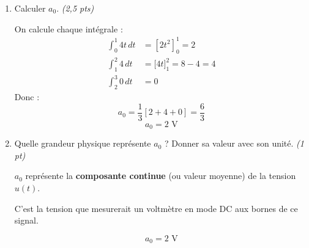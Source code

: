 \documentclass[a4paper,11pt]{article}
\begin{document}
\begin{enumerate}[label=\textbf{\arabic*.}]
  \item Calculer $a_0$. \hfill \textit{(2,5 pts)}
  \begin{tcolorbox}[corrigebox]
    On calcule chaque intégrale :
    \begin{align*}
      \int_0^1 4t\,dt &= \left[2t^2\right]_0^1 = 2 \\[6pt]
      \int_1^2 4\,dt &= \Big[4t\Big]_1^2 = 8 - 4 = 4 \\[6pt]
      \int_2^3 0\,dt &= 0
    \end{align*}
    Donc :
    \[
      a_0 = \frac{1}{3}\left[2 + 4 + 0\right] = \frac{6}{3}
    \]
    \[\boxed{a_0 = 2 \text{ V}}\]
  \end{tcolorbox}

  \item Quelle grandeur physique représente $a_0$ ? Donner sa valeur avec son unité. \hfill \textit{(1 pt)}
  \begin{tcolorbox}[corrigebox]
    $a_0$ représente la \textbf{composante continue} (ou valeur moyenne) de la tension $u(t)$.

    C'est la tension que mesurerait un voltmètre en mode DC aux bornes de ce signal.

    \[\boxed{a_0 = 2 \text{ V}}\]
  \end{tcolorbox}
\end{enumerate}
\end{document}
